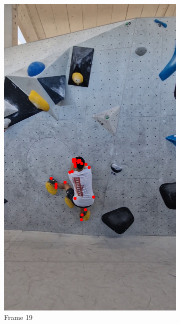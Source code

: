 \documentclass[./main.tex]{subfiles}
\begin{document}
\begin{figure}[htbp]
\begin{subfigure}{0.3\textwidth}
        \includegraphics[width=\textwidth]{entities/CA_19.png}
        \caption{Frame 19}
    \end{subfigure}
    \begin{subfigure}{0.3\textwidth}
        \centering

\end{subfigure}
\end{figure}
\end{document}

